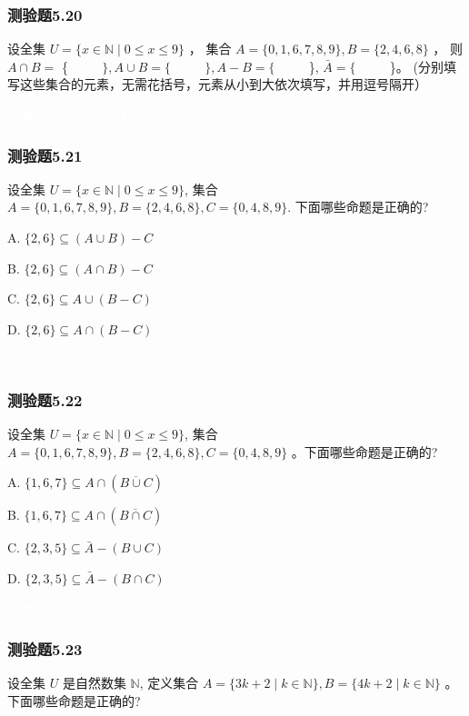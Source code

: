 \documentclass[UTF8, heading=true]{ctexart}
\begin{document}
\subsubsection{测验题5.20}

设全集 $U=\{x \in \mathbb{N} \mid 0 \leq x \leq 9\}$ ，
集合 $A=\{0,1,6,7,8,9\}, B=\{2,4,6,8\}$ ，
则 $A \cap B=$ \{ $\qquad$ $\}, A \cup B=\{$ $\qquad$ $\}, A-B=\{$ $\qquad$ \}, $\bar{A}=\{$ $\qquad$ \}。 (分别填写这些集合的元素，无需花括号，元素从小到大依次填写，并用逗号隔开）

\textcolor{white}{答案：(1) $6,8$
(2) $0,1,2,4,6,7,8,9$
(3) $0,1,7,9$
(4) $2,3,4,5$}


\subsubsection{测验题5.21}

设全集 $U=\{x \in \mathbb{N} \mid 0 \leq x \leq 9\}$, 集合 $A=\{0,1,6,7,8,9\}, B=\{2,4,6,8\}, C=\{0,4,8,9\}$. 下面哪些命题是正确的?

A. $\{2,6\} \subseteq(A \cup B)-C$

B. $\{2,6\} \subseteq(A \cap B)-C$

C. $\{2,6\} \subseteq A \cup(B-C)$

D. $\{2,6\} \subseteq A \cap(B-C)$

\textcolor{white}{答案：AC}

\subsubsection{测验题5.22}

设全集 $U=\{x \in \mathbb{N} \mid 0 \leq x \leq 9\}$, 
集合 $A=\{0,1,6,7,8,9\}, B=\{2,4,6,8\}, C=\{0,4,8,9\}$ 。下面哪些命题是正确的?

A. $\{1,6,7\} \subseteq A \cap(\overline{B \cup C})$

B. $\{1,6,7\} \subseteq A \cap(\overline{B \cap C})$

C. $\{2,3,5\} \subseteq \bar{A}-(B \cup C)$

D. $\{2,3,5\} \subseteq \bar{A}-(B \cap C)$

\textcolor{white}{答案：BD}

\subsubsection{测验题5.23}
设全集 $U$ 是自然数集 $\mathbb{N}$, 定义集合 $A=\{3 k+2 \mid k \in \mathbb{N}\}, B=\{4 k+2 \mid k \in \mathbb{N}\}$ 。下面哪些命题是正确的?
\end{document}
